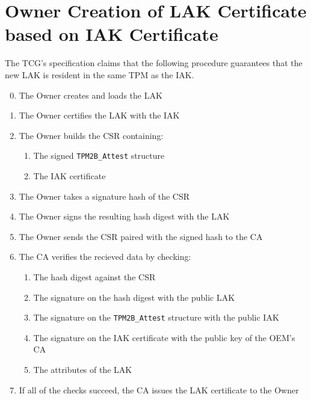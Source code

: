 \section{Owner Creation of LAK Certificate based on IAK Certificate}


The TCG's specification claims that the following procedure guarantees that the new LAK is resident in the same TPM as the IAK.
\begin{enumerate}[itemsep=0pt,parsep=0pt,partopsep=0pt]
  \setcounter{enumi}{-1}
  \item The Owner creates and loads the LAK
  \item The Owner certifies the LAK with the IAK
  \item The Owner builds the CSR containing:
  \begin{enumerate}[topsep=0pt, itemsep=0pt,parsep=0pt,partopsep=0pt]
    \item The signed \verb|TPM2B_Attest| structure
    \item The IAK certificate
  \end{enumerate}
  \item The Owner takes a signature hash of the CSR
  \item The Owner signs the resulting hash digest with the LAK
  \item The Owner sends the CSR paired with the signed hash to the CA
  \item The CA verifies the recieved data by checking:
  \begin{enumerate}[topsep=0pt, itemsep=0pt,parsep=0pt,partopsep=0pt]
    \item The hash digest against the CSR
    \item The signature on the hash digest with the public LAK
    \item The signature on the \verb|TPM2B_Attest| structure with the public IAK
    \item The signature on the IAK certificate with the public key of the OEM's CA
    \item The attributes of the LAK
  \end{enumerate}
  \item If all of the checks succeed, the CA issues the LAK certificate to the Owner
\end{enumerate}

